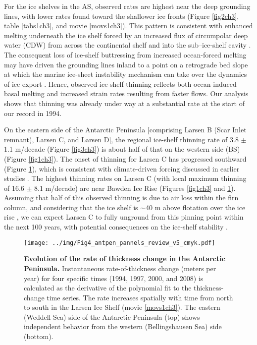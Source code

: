 For the ice shelves in the AS, observed rates
are highest near the deep grounding lines, with
lower rates found toward the shallower ice fronts
(Figure \ref{fig2ch3}, table \ref{tabs1ch3}, and movie \ref{movs1ch3}). This pattern is
consistent with enhanced melting underneath
the ice shelf forced by an increased flux of circumpolar
deep water (CDW) from across the continental
shelf and into the sub–ice-shelf cavity
\parencite{Dutrieux2014, Jacobs2011, Thoma2008}. The consequent loss of ice-shelf buttressing
from increased ocean-forced melting may
have driven the grounding lines inland \parencite{Rignot2014} to
a point on a retrograde bed slope at which the
marine ice-sheet instability mechanism can take
over the dynamics of ice export \parencite{Schoof2007, Weertman1974}. Hence,
observed ice-shelf thinning reflects both ocean-induced
basal melting and increased strain rates
resulting from faster flows. Our analysis shows
that thinning was already under way at a substantial
rate at the start of our record in 1994.

On the eastern side of the Antarctic Peninsula
[comprising Larsen B (Scar Inlet remnant), Larsen 
C, and Larsen D], the regional ice-shelf thinning
rate of 3.8 $\pm$ 1.1 m/decade (Figure \ref{fig3ch3}) is about half of
that on the western side (BS) (Figure \ref{fig1ch3}). The onset of
thinning for Larsen C has progressed southward
(Figure \ref{fig4ch3}), which is consistent with climate-driven
forcing discussed in earlier studies \parencite{Fricker2012, Cook2010}. The
highest thinning rates on Larsen C (with local
maximum thinning of 16.6 $\pm$ 8.1 m/decade) are
near Bawden Ice Rise (Figures \ref{fig1ch3} and \ref{fig4ch3}). Assuming
that half of this observed thinning is due to air
loss within the firn column, and considering
that the ice shelf is $\sim$40 m above flotation over
the ice rise \parencite{Holland2015}, we can expect Larsen C to fully
unground from this pinning point within the
next 100 years, with potential consequences on
the ice-shelf stability \parencite{Borstad2013}.


\begin{figure}[!ht]
  \texttt{[image: ../img/Fig4\_antpen\_pannels\_review\_v5\_cmyk.pdf]}
  \caption{{\bf
  Evolution of the rate of thickness
  change in the Antarctic Peninsula.} Instantaneous
  rate-of-thickness change (meters per year) for
  four specific times (1994, 1997, 2000, and 2008)
  is calculated as the derivative of the polynomial fit
  to the thickness-change time series. The rate
  increases spatially with time from north to south
  in the Larsen Ice Shelf (movie \ref{movs1ch3}). The eastern
  (Weddell Sea) side of the Antarctic Peninsula (top)
  shows independent behavior from the western
  (Bellingshausen Sea) side (bottom).
  }
  \label{fig4ch3}
\end{figure}


